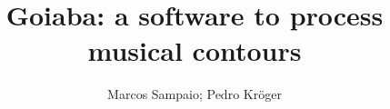 \documentclass[12pt]{article}
\title{Goiaba: a software to process musical contours}
\author{Marcos Sampaio; Pedro Kröger}
\begin{document}
\maketitle

\begin{abstract}

\end{abstract}





\end{document}
